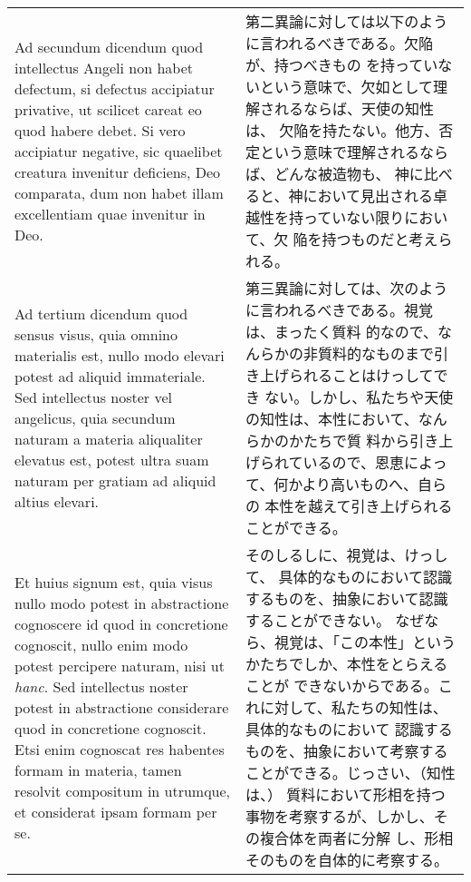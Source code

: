 \documentclass[10pt]{jsarticle} %
\begin{document}
\begin{longtable}{p{21em}p{21em}}
{\sc Ad secundum dicendum} quod intellectus Angeli non habet defectum,
si defectus accipiatur privative, ut scilicet careat eo quod habere
debet. Si vero accipiatur negative, sic quaelibet creatura invenitur
deficiens, Deo comparata, dum non habet illam excellentiam quae
invenitur in Deo.

&

第二異論に対しては以下のように言われるべきである。欠陥が、持つべきもの
を持っていないという意味で、欠如として理解されるならば、天使の知性は、
欠陥を持たない。他方、否定という意味で理解されるならば、どんな被造物も、
神に比べると、神において見出される卓越性を持っていない限りにおいて、欠
陥を持つものだと考えられる。

\\


{\sc Ad tertium dicendum} quod sensus visus, quia omnino materialis
est, nullo modo elevari potest ad aliquid immateriale. Sed intellectus
noster vel angelicus, quia secundum naturam a materia aliqualiter
elevatus est, potest ultra suam naturam per gratiam ad aliquid altius
elevari. 

&

第三異論に対しては、次のように言われるべきである。視覚は、まったく質料
的なので、なんらかの非質料的なものまで引き上げられることはけっしてでき
ない。しかし、私たちや天使の知性は、本性において、なんらかのかたちで質
料から引き上げられているので、恩恵によって、何かより高いものへ、自らの
本性を越えて引き上げられることができる。


\\

Et huius signum est, quia visus nullo modo potest in
abstractione cognoscere id quod in concretione cognoscit, nullo enim
modo potest percipere naturam, nisi ut {\it hanc}. Sed intellectus
noster potest in abstractione considerare quod in concretione
cognoscit. Etsi enim cognoscat res habentes formam in materia, tamen
resolvit compositum in utrumque, et considerat ipsam formam per se. 

&

そのしるしに、視覚は、けっして、
具体的なものにおいて認識するものを、抽象において認識することができない。
なぜなら、視覚は、「この本性」というかたちでしか、本性をとらえることが
できないからである。これに対して、私たちの知性は、具体的なものにおいて
認識するものを、抽象において考察することができる。じっさい、（知性は、）
質料において形相を持つ事物を考察するが、しかし、その複合体を両者に分解
し、形相そのものを自体的に考察する。

\\


\end{longtable}
\end{document}
